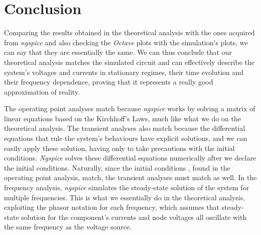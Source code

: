\section{Conclusion}
\label{sec:conclusion}

Comparing the results obtained in the theoretical analysis  with the ones acquired from \textit{ngspice} and
also checking the \textit{Octave} plots with the simulation's plots, we can say that they are essentially the same. We can thus conclude
that our theoretical analysis matches the simulated circuit and can effectively describe the system's voltages and currents in stationary regimes,
their time evolution and their frequency dependence, proving that it represents a really good approximation of reality.

\par

The operating point analyses match because \textit{ngspice} works by solving a matrix of linear equations based on the Kirchhoff's Laws, much like
what we do on the theoretical analysis. The transient analyses also match because the differential equations that rule the system's behaviours have
explicit solutions, and we can easily apply these solution, having only to take precautions with the initial conditions. \textit{Ngspice} solves these
differential equations numerically after we declare the initial conditions. Naturally, since the initial conditions , found in the operating point analysis, match,
the transient analyses must match as well. In the frequency analysis, \textit{ngspice} simulates the steady-state solution of the system for multiple frequencies.
This is what we essentially do in the theoretical analysis, exploiting the phasor notation for each frequency, which assumes that steady-state solution for the component's currents and node
voltages all oscillate with the same frequency as the voltage source.
